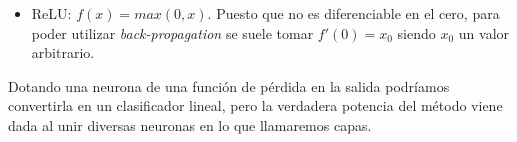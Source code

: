\documentclass[12,twoside]{TFG-GM}
\makeatletter
\theoremstyle{definition}
\theoremstyle{remark}
\def\tikzscale{1}\begin{lrbox}{\measure@tikzpicture}%
\edef\tikzscale{\pgfmathresult}%
\makeatother
\begin{document}
\begin{itemize}
\item ReLU: $f(x)=max(0,x)$. Puesto que no es diferenciable en el cero, para poder utilizar \textit{back-propagation} se suele tomar $f'(0)=x_0$ siendo $x_0$ un valor arbitrario. 

\begin{figure}[H]
\centering
\begin{scaletikzpicturetowidth}{0.5\textwidth}
\end{scaletikzpicturetowidth}
\end{figure}
\end{itemize}


Dotando una neurona de una función de pérdida en la salida podríamos convertirla en un clasificador lineal, pero la verdadera potencia del método viene dada al unir diversas neuronas en lo que llamaremos capas.
\end{document}
